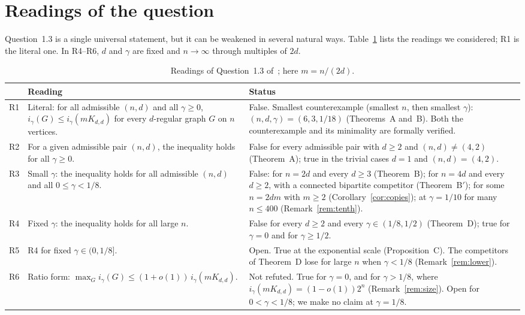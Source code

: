 \documentclass[11pt]{article}
\theoremstyle{remark}
\begin{document}
\section{Readings of the question}\label{sec:readings}
Question~1.3 is a single universal statement, but it can be weakened in
several natural ways. Table~\ref{tab:readings} lists the readings we
considered; R1 is the literal one. In R4--R6, $d$ and $\gamma$ are fixed and
$n\to\infty$ through multiples of $2d$.

\begin{table}[ht]\centering\small
\begin{tabular}{@{}l >{\raggedright\arraybackslash}p{}
 >{\raggedright\arraybackslash}p{}@{}}\toprule
 & Reading & Status\\\midrule
R1 & Literal: for all admissible $(n,d)$ and all $\gamma\ge0$,
 $i_\gamma(G)\le i_\gamma(mK_{d,d})$ for every $d$-regular graph $G$ on $n$
 vertices.
 & False. Smallest counterexample (smallest $n$, then smallest $\gamma$):
 $(n,d,\gamma)=(6,3,1/18)$ (Theorems~A and~B). Both the counterexample and
 its minimality are formally verified.\\\addlinespace
R2 & For a given admissible pair $(n,d)$, the inequality holds for all
 $\gamma\ge0$.
 & False for every admissible pair with $d\ge2$ and $(n,d)\ne(4,2)$
 (Theorem~A); true in the trivial cases $d=1$ and $(n,d)=(4,2)$.\\\addlinespace
R3 & Small $\gamma$: the inequality holds for all admissible $(n,d)$ and all
 $0\le\gamma<1/8$.
 & False: for $n=2d$ and every $d\ge3$ (Theorem~B); for $n=4d$ and every
 $d\ge2$, with a connected bipartite competitor (Theorem~B$'$); for some
 $n=2dm$ with $m\ge2$ (Corollary~\ref{cor:copies}); at $\gamma=1/10$ for many
 $n\le400$ (Remark~\ref{rem:tenth}).\\\addlinespace
R4 & Fixed $\gamma$: the inequality holds for all large $n$.
 & False for every $d\ge2$ and every $\gamma\in(1/8,1/2)$ (Theorem~D); true
 for $\gamma=0$ and for $\gamma\ge1/2$.\\\addlinespace
R5 & R4 for fixed $\gamma\in(0,1/8]$.
 & Open. True at the exponential scale (Proposition~C). The competitors of
 Theorem~D lose for large $n$ when $\gamma<1/8$
 (Remark~\ref{rem:lower}).\\\addlinespace
R6 & Ratio form: $\max_Gi_\gamma(G)\le(1+o(1))\,i_\gamma(mK_{d,d})$.
 & Not refuted. True for $\gamma=0$, and for $\gamma>1/8$, where
 $i_\gamma(mK_{d,d})=(1-o(1))2^n$ (Remark~\ref{rem:size}). Open for
 $0<\gamma<1/8$; we make no claim at $\gamma=1/8$.\\\bottomrule
\end{tabular}
\caption{Readings of Question~1.3 of~\cite{car}; here $m=n/(2d)$.}
\label{tab:readings}
\end{table}
\end{document}
